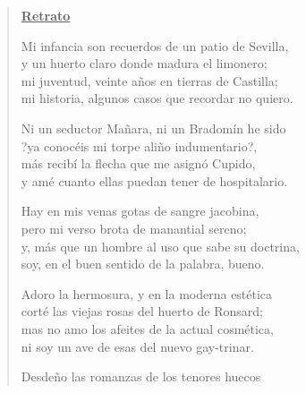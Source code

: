\begin{verse}

\begin{center}

\underline{\bf Retrato}

Mi infancia son recuerdos de un patio de Sevilla, \\


y un huerto claro donde madura el limonero; \\


mi juventud, veinte años en tierras de Castilla; \\


mi historia, algunos casos que recordar no quiero.

\par

Ni un seductor Mañara, ni un Bradomín he sido \\


?ya conocéis mi torpe aliño indumentario?, \\


más recibí la flecha que me asignó Cupido, \\


y amé cuanto ellas puedan tener de hospitalario.

\par

Hay en mis venas gotas de sangre jacobina, \\


pero mi verso brota de manantial sereno; \\


y, más que un hombre al uso que sabe su doctrina, \\


soy, en el buen sentido de la palabra, bueno.

\par

Adoro la hermosura, y en la moderna estética \\


corté las viejas rosas del huerto de Ronsard; \\


mas no amo los afeites de la actual cosmética, \\


ni soy un ave de esas del nuevo gay-trinar.

\par

Desdeño las romanzas de los tenores huecos \\



\end{center}
\end{verse}
